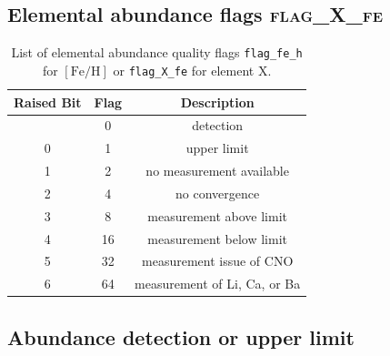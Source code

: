 \documentclass[
  journal=pasa,
  manuscript=research-paper, %
  year=2023,
  volume=37
]{cup-journal}
\newcommand{\feh}{$\mathrm{[Fe/H]}$\xspace}
\begin{document}
\subsection{Elemental abundance flags \textsc{flag\_X\_fe}}
\label{sec:flag_x_fe}

\begin{table}
\centering
\caption{List of elemental abundance quality flags \texttt{flag\_fe\_h} for \feh or \texttt{flag\_X\_fe} for element X.}
\label{tab:flag_x_fe}
\begin{tabular}{ccc}
\hline \hline
Raised Bit & Flag & Description \\
\hline
  & 0 & detection \\ 
0 & 1 & upper limit \\ 
1 & 2 & no measurement available\\
2 & 4 & no convergence\\
3 & 8 & measurement above limit\\
4 & 16 & measurement below limit\\
5 & 32 & measurement issue of CNO \\
6 & 64 & measurement of Li, Ca, or Ba \\ %
\hline
\end{tabular}
\end{table}

\subsection{Abundance detection or upper limit}
\label{sec:abundance_detection_or_upper_limit}
\end{document}
